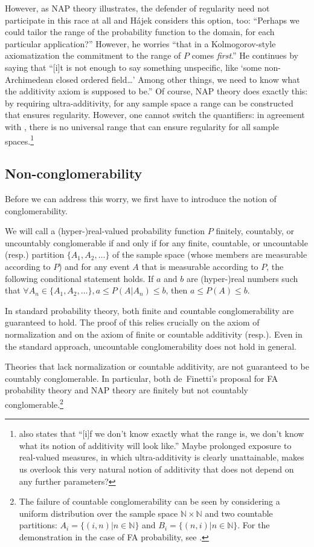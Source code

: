 However, as NAP theory illustrates, the defender of regularity need not participate in this race at all and H{\'a}jek considers this option, too: ``Perhaps we could tailor the range of the probability function to the domain, for each particular application?'' However, he worries ``that in a Kolmogorov-style axiomatization the commitment to the range of $P$ comes \emph{first}.'' He continues by saying that ``[i]t is not enough to say something unspecific, like `some non-Archimedean closed ordered field\ldots' Among other things, we need to know
what the additivity axiom is supposed to be.'' Of course, NAP theory does exactly this: by requiring ultra-additivity, for any  sample space a range can be constructed that ensures regularity. However, one cannot switch the quantifiers: in agreement with \citet{Pruss:2013}, there is no universal range that can ensure regularity for all sample spaces.\footnote{\citet{Hajek:2012b} also states that ``[i]f we don't know exactly what the range is, we don't know what its notion of additivity will look like.'' Maybe prolonged exposure to real-valued measures, in which ultra-additivity is clearly unattainable, makes us overlook this very natural notion of additivity that does not depend on any further parameters?}

\subsection{Non-conglomerability}
Before we can address this worry, we first have to introduce the notion of conglomerability.

We will call a (hyper-)real-valued probability function $P$ finitely, countably, or uncountably conglomerable if and only if for any finite, countable, or uncountable (resp.) partition $\{A_1, A_2, \ldots \}$ of the sample space (whose members are measurable according to $P$) and for any event $A$ that is measurable according to $P$, the following conditional statement holds. If $a$ and $b$ are (hyper-)real numbers such that $\forall A_n \in \{A_1, A_2, \ldots \}, a \leq P(A|A_n) \leq b$, then $a \leq P(A) \leq b$.

In standard probability theory, both finite and countable conglomerability are guaranteed to hold. The proof of this relies crucially on the axiom of normalization and on the axiom of finite or countable additivity (resp.). Even in the standard approach, uncountable conglomerability does not hold in general.

Theories that lack normalization or countable additivity, are not guaranteed to be countably conglomerable. In particular, both de~Finetti's proposal for FA probability theory and NAP theory are finitely but not countably conglomerable.\footnote{The failure of countable conglomerability can be seen by considering a uniform distribution over the sample space $\mathbb{N}\times\mathbb{N}$ and two countable partitions: $A_i = \{(i,n) | n\in \mathbb{N} \}$ and $B_i=\{(n,i) | n \in \mathbb{N} \}$. For the demonstration in the case of FA probability, see \citet[Ch.~5]{deFinetti:1972}.}

